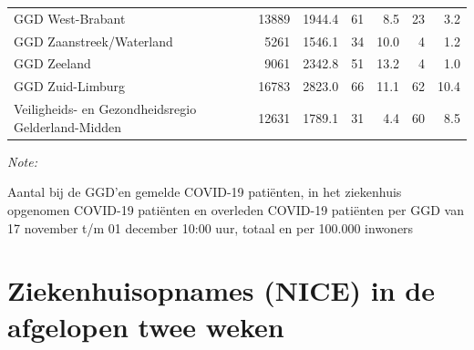 \documentclass[
  english,
  man,floatsintext]{apa6}
\begin{document}
\begin{table}
\begin{threeparttable}
\begin{tabular}{lrrrrrr}
GGD West-Brabant & 13889 & 1944.4 & 61 & 8.5 & 23 & 3.2\\
GGD Zaanstreek/Waterland & 5261 & 1546.1 & 34 & 10.0 & 4 & 1.2\\
GGD Zeeland & 9061 & 2342.8 & 51 & 13.2 & 4 & 1.0\\
GGD Zuid-Limburg & 16783 & 2823.0 & 66 & 11.1 & 62 & 10.4\\
Veiligheids- en Gezondheidsregio Gelderland-Midden & 12631 & 1789.1 & 31 & 4.4 & 60 & 8.5\\
\bottomrule
\end{tabular}
\begin{tablenotes}
\item \textit{Note: } 
\item Aantal bij de GGD’en gemelde COVID-19 patiënten, in het ziekenhuis opgenomen COVID-19 patiënten en overleden COVID-19 patiënten per GGD van 17 november t/m 01 december 10:00 uur, totaal en per 100.000 inwoners
\end{tablenotes}
\end{threeparttable}
\endgroup{}
\end{table}

\newpage

\hypertarget{ziekenhuisopnames-nice-in-de-afgelopen-twee-weken}{%
\section{Ziekenhuisopnames (NICE) in de afgelopen twee weken}\label{ziekenhuisopnames-nice-in-de-afgelopen-twee-weken}}
\end{document}
